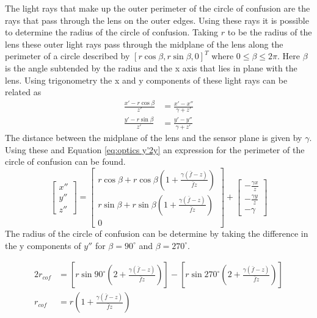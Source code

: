 \documentclass[12pt,oneside,openany,a4paper, %
english, %
masters-t, goldenblock]{usthesis}
\newcommand*\mean[1]{\bar{#1}} %
\begin{document}
The light rays that make up the outer perimeter of the circle of confusion are the rays that pass through the lens on the outer edges. Using these rays it is possible to determine the radius of the circle of confusion. Taking $r$ to be the radius of the lens these outer light rays pass through the midplane of the lens along the perimeter of a circle described by $[r \cos \beta, r \sin \beta, 0]^T$ where $0 \leq \beta \leq 2\pi$. Here $\beta$ is the angle subtended by the radius and the x axis that lies in plane with the lens. Using trigonometry the x and y components of these light rays can be related as
\begin{align}
  \frac{x' - r \cos \beta}{z'} &= \frac{x' - x''}{\gamma + z'} \\
  \frac{y' - r \sin \beta}{z'} &= \frac{y' - y''}{\gamma + z'} 
\end{align}
The distance between the midplane of the lens and the sensor plane is given by $\gamma$. Using these and Equation \ref{eq:optics y'2y} an expression for the perimeter of the circle of confusion can be found.
\begin{equation}
\label{eq:cof}
  \begin{bmatrix}
  x'' \\
  y'' \\
  z''
  \end{bmatrix} =
  \begin{bmatrix}
  r \cos \beta + r \cos \beta \left( 1 + \frac{\gamma \left( \mean{f} - z \right)}{\mean{f} z} \right) \\
  r \sin \beta + r \sin \beta \left( 1 + \frac{\gamma \left( \mean{f} - z \right)}{\mean{f} z} \right) \\
  0
  \end{bmatrix} +
  \begin{bmatrix}
  -\frac{\gamma x}{z} \\
  -\frac{\gamma y}{z} \\
  - \gamma
  \end{bmatrix}
\end{equation}
The radius of the circle of confusion can be determine by taking the difference in the y components of $y''$ for $\beta=90 ^{\circ} $ and $\beta=270 ^{\circ}$.

\begin{align}
  2 r_{cof} &= \left[r \sin 90 ^{\circ} \left( 2 + \frac{\gamma \left( \mean{f} - z \right)}{\mean{f} z} \right) \right] - \left[r \sin 270 ^{\circ} \left( 2 + \frac{\gamma \left( \mean{f} - z \right)}{\mean{f} z} \right) \right] \\
  r_{cof}&=r \left( 1 + \frac{\gamma \left( \mean{f} - z \right)}{\mean{f}z} \right)
\end{align}
\end{document}
